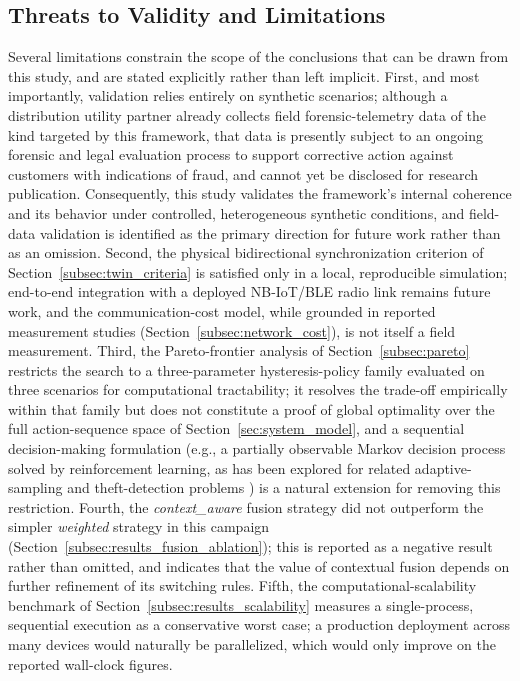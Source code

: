 \documentclass{ieeeaccess}
\begin{document}
\subsection{Threats to Validity and Limitations}
\label{subsec:limitations}
Several limitations constrain the scope of the conclusions that can be drawn from this study, and are stated explicitly rather than left implicit. First, and most importantly, validation relies entirely on synthetic scenarios; although a distribution utility partner already collects field forensic-telemetry data of the kind targeted by this framework, that data is presently subject to an ongoing forensic and legal evaluation process to support corrective action against customers with indications of fraud, and cannot yet be disclosed for research publication. Consequently, this study validates the framework's internal coherence and its behavior under controlled, heterogeneous synthetic conditions, and field-data validation is identified as the primary direction for future work rather than as an omission. Second, the physical bidirectional synchronization criterion of Section~\ref{subsec:twin_criteria} is satisfied only in a local, reproducible simulation; end-to-end integration with a deployed NB-IoT/BLE radio link remains future work, and the communication-cost model, while grounded in reported measurement studies (Section~\ref{subsec:network_cost}), is not itself a field measurement. Third, the Pareto-frontier analysis of Section~\ref{subsec:pareto} restricts the search to a three-parameter hysteresis-policy family evaluated on three scenarios for computational tractability; it resolves the trade-off empirically within that family but does not constitute a proof of global optimality over the full action-sequence space of Section~\ref{sec:system_model}, and a sequential decision-making formulation (e.g., a partially observable Markov decision process solved by reinforcement learning, as has been explored for related adaptive-sampling and theft-detection problems \cite{b38}) is a natural extension for removing this restriction. Fourth, the \textit{context\_aware} fusion strategy did not outperform the simpler \textit{weighted} strategy in this campaign (Section~\ref{subsec:results_fusion_ablation}); this is reported as a negative result rather than omitted, and indicates that the value of contextual fusion depends on further refinement of its switching rules. Fifth, the computational-scalability benchmark of Section~\ref{subsec:results_scalability} measures a single-process, sequential execution as a conservative worst case; a production deployment across many devices would naturally be parallelized, which would only improve on the reported wall-clock figures.
\end{document}
